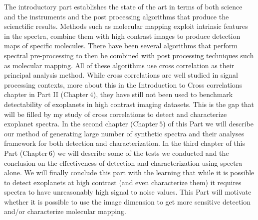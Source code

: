 The introductory part establishes the state of the art in terms of both science and the instruments and the post processing algorithms that produce the scienctific results.
Methods such as molecular mapping exploit intrinsic features in the spectra, combine them with high contrast images to produce detection maps of specific molecules.
There have been several algorithms \citep[e.g HRSDI][]{2019Haffert} that perform spectral pre-processing to then be combined with post processing techniques such as molecular mapping.
All of these algorithms use cross correlation as their principal analysis method. 
While cross correlations are well studied in signal processing contexts, more about this in the Introduction to Cross correlations chapter in Part II (Chapter$~4$),
they have still not been used to benchmark detectability of exoplanets in high contrast imaging datasets.
This is the gap that will be filled by my study of cross correlations to detect and characterize exoplanet spectra.
In the second chapter (Chapter$~5$) of this Part we will describe our method of generating large number of synthetic spectra and their analyses framework for both detection and characterization.
In the third chapter of this Part (Chapter$~6$) we will describe some of the tests we conducted and the conclusion on the effectiveness of detection and characterization using spectra alone.
We will finally conclude this part with the learning that while it is possible to detect exoplanets at high contrast (and even characterize them) it requires spectra to have unreasonably high signal to noise values.
This Part will motivate whether it is possible to use the image dimension to get more sensitive detection and/or characterize molecular mapping.

